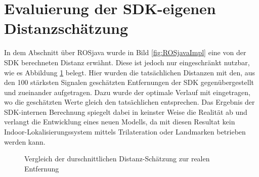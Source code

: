 \section{Evaluierung der SDK-eigenen Distanzschätzung}
In dem Abschnitt über ROSjava wurde in Bild \ref{fig:ROSjavaImpl} eine von der SDK berechneten Distanz erwähnt. Diese ist jedoch nur eingeschränkt nutzbar, wie es Abbildung \ref{fig:DisrealDistance} belegt. Hier wurden die tatsächlichen Distanzen mit den, aus den 100 stärksten Signalen geschätzten Entfernungen der SDK gegenübergestellt und zueinander aufgetragen. Dazu wurde der optimale Verlauf mit eingetragen, wo die geschätzten Werte gleich den tatsächlichen entsprechen. Das Ergebnis der SDK-internen Berechnung spiegelt dabei in keinster Weise die Realität ab und verlangt die Entwicklung eines neuen Modells, da mit diesen Resultat kein Indoor-Lokalisierungssystem mittels Trilateration oder Landmarken betrieben werden kann.  
\begin{figure}[H] 
\centering
{}
\caption{Vergleich der durschnittlichen Distanz-Schätzung zur realen Entfernung}
\label{fig:DisrealDistance}
\end{figure}
